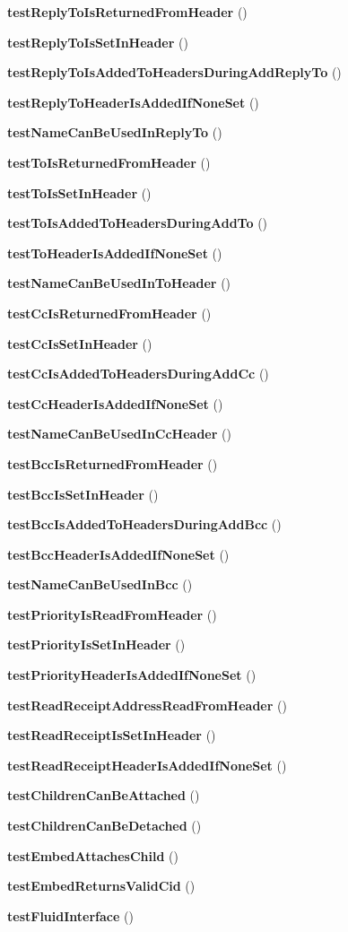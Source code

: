 \begin{DoxyCompactItemize}
\item 
{\bf test\+Reply\+To\+Is\+Returned\+From\+Header} ()
\item 
{\bf test\+Reply\+To\+Is\+Set\+In\+Header} ()
\item 
{\bf test\+Reply\+To\+Is\+Added\+To\+Headers\+During\+Add\+Reply\+To} ()
\item 
{\bf test\+Reply\+To\+Header\+Is\+Added\+If\+None\+Set} ()
\item 
{\bf test\+Name\+Can\+Be\+Used\+In\+Reply\+To} ()
\item 
{\bf test\+To\+Is\+Returned\+From\+Header} ()
\item 
{\bf test\+To\+Is\+Set\+In\+Header} ()
\item 
{\bf test\+To\+Is\+Added\+To\+Headers\+During\+Add\+To} ()
\item 
{\bf test\+To\+Header\+Is\+Added\+If\+None\+Set} ()
\item 
{\bf test\+Name\+Can\+Be\+Used\+In\+To\+Header} ()
\item 
{\bf test\+Cc\+Is\+Returned\+From\+Header} ()
\item 
{\bf test\+Cc\+Is\+Set\+In\+Header} ()
\item 
{\bf test\+Cc\+Is\+Added\+To\+Headers\+During\+Add\+Cc} ()
\item 
{\bf test\+Cc\+Header\+Is\+Added\+If\+None\+Set} ()
\item 
{\bf test\+Name\+Can\+Be\+Used\+In\+Cc\+Header} ()
\item 
{\bf test\+Bcc\+Is\+Returned\+From\+Header} ()
\item 
{\bf test\+Bcc\+Is\+Set\+In\+Header} ()
\item 
{\bf test\+Bcc\+Is\+Added\+To\+Headers\+During\+Add\+Bcc} ()
\item 
{\bf test\+Bcc\+Header\+Is\+Added\+If\+None\+Set} ()
\item 
{\bf test\+Name\+Can\+Be\+Used\+In\+Bcc} ()
\item 
{\bf test\+Priority\+Is\+Read\+From\+Header} ()
\item 
{\bf test\+Priority\+Is\+Set\+In\+Header} ()
\item 
{\bf test\+Priority\+Header\+Is\+Added\+If\+None\+Set} ()
\item 
{\bf test\+Read\+Receipt\+Address\+Read\+From\+Header} ()
\item 
{\bf test\+Read\+Receipt\+Is\+Set\+In\+Header} ()
\item 
{\bf test\+Read\+Receipt\+Header\+Is\+Added\+If\+None\+Set} ()
\item 
{\bf test\+Children\+Can\+Be\+Attached} ()
\item 
{\bf test\+Children\+Can\+Be\+Detached} ()
\item 
{\bf test\+Embed\+Attaches\+Child} ()
\item 
{\bf test\+Embed\+Returns\+Valid\+Cid} ()
\item 
{\bf test\+Fluid\+Interface} ()
\end{DoxyCompactItemize}
